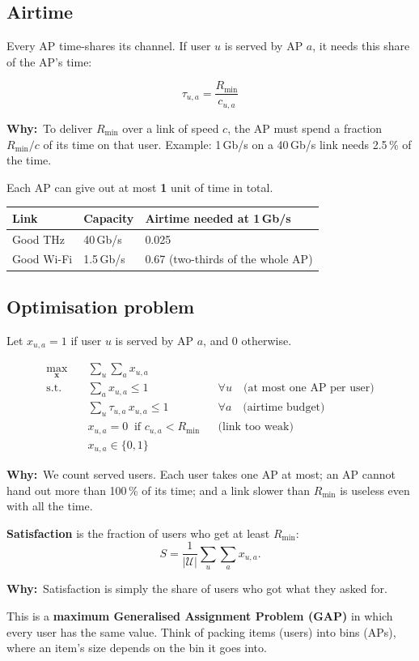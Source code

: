 \documentclass[11pt,a4paper]{article}
\newcommand{\Rmin}{R_{\min}}
\newcommand{\why}[1]{\par\smallskip\noindent\begin{minipage}{\linewidth}\small
  \textcolor{whyc}{\textbf{Why:}}~#1\end{minipage}\par\medskip}
\begin{document}
\subsection{Airtime}
Every AP time-shares its channel. If user $u$ is served by AP $a$, it needs this share of
the AP's time:
\begin{keybox}
\[
\tau_{u,a}=\frac{\Rmin}{c_{u,a}}
\]
\end{keybox}
\why{To deliver $\Rmin$ over a link of speed $c$, the AP must spend a fraction $\Rmin/c$ of its time on that user. Example: 1\,Gb/s on a 40\,Gb/s link needs 2.5\,\% of the time.}
Each AP can give out at most \textbf{1} unit of time in total.
\begin{center}
\begin{tabular}{@{}lll@{}}
\toprule
Link & Capacity & Airtime needed at 1\,Gb/s\\
\midrule
Good THz & 40\,Gb/s & 0.025\\
Good Wi-Fi & 1.5\,Gb/s & 0.67 (two-thirds of the whole AP)\\
\bottomrule
\end{tabular}
\end{center}

\subsection{Optimisation problem}
Let $x_{u,a}=1$ if user $u$ is served by AP $a$, and 0 otherwise.
\begin{keybox}
\begin{align*}
\max_{\mathbf{x}}\quad & \sum_{u}\sum_{a}x_{u,a}\\
\text{s.t.}\quad & \sum_{a}x_{u,a}\le1 && \forall u \quad\text{(at most one AP per user)}\\
& \sum_{u}\tau_{u,a}\,x_{u,a}\le1 && \forall a \quad\text{(airtime budget)}\\
& x_{u,a}=0\ \text{ if } c_{u,a}<\Rmin && \text{(link too weak)}\\
& x_{u,a}\in\{0,1\}
\end{align*}
\end{keybox}
\why{We count served users. Each user takes one AP at most; an AP cannot hand out more than 100\,\% of its time; and a link slower than $\Rmin$ is useless even with all the time.}
\textbf{Satisfaction} is the fraction of users who get at least $\Rmin$:
\[
S=\frac{1}{|\mathcal{U}|}\sum_{u}\sum_{a}x_{u,a}.
\]
\why{Satisfaction is simply the share of users who got what they asked for.}
This is a \textbf{maximum Generalised Assignment Problem (GAP)} in which every user has the
same value. Think of packing items (users) into bins (APs), where an item's size depends on
the bin it goes into.
\end{document}
